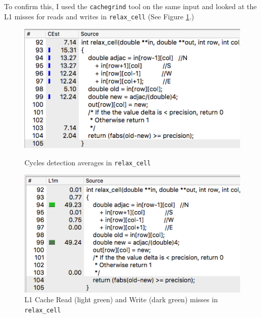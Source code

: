 \documentclass[12pt]{article}
\begin{document}
To confirm this, I used the \texttt{cachegrind} tool on the same input and looked at the L1 misses for reads and writes in \texttt{relax\_cell} (See Figure \ref{fig:source-misses}.)

\begin{figure}[htbp!]
    \begin{minipage}{.49\textwidth}
        \hspace{-0.3cm}\includegraphics[width=\textwidth]{img/source-cycles}
        \centering\caption{Cycles detection averages in \texttt{relax\_cell}}
        \label{fig:source-cycles}
    \end{minipage}\hspace{0.8cm}
    \begin{minipage}{0.49\textwidth}
       \hspace{-0.3cm}\includegraphics[width=\textwidth]{img/source-misses.png}
        \centering\caption{L1 Cache Read (light green) and Write (dark green) misses in \texttt{relax\_cell}}
        \label{fig:source-misses}
    \end{minipage}
\end{figure}
\end{document}
